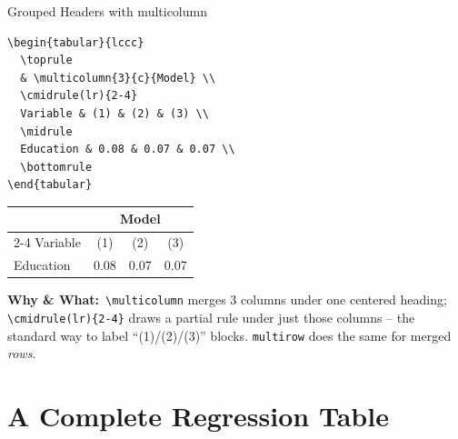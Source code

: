 \documentclass[11pt,aspectratio=169]{beamer}
\newcommand{\whybox}[1]{%
  \vspace{2pt}
  {\scriptsize\raggedright\textcolor{red!55!black}{\textbf{Why \& What:}}~#1\par}
}
\begin{document}
\begin{frame}[fragile]{Grouped Headers with multicolumn}
  \vspace{-4pt}
  \begin{lstlisting}[basicstyle=\ttfamily\tiny,aboveskip=1pt,belowskip=1pt]
\begin{tabular}{lccc}
  \toprule
  & \multicolumn{3}{c}{Model} \\
  \cmidrule(lr){2-4}
  Variable & (1) & (2) & (3) \\
  \midrule
  Education & 0.08 & 0.07 & 0.07 \\
  \bottomrule
\end{tabular}
  \end{lstlisting}
  \begin{outputbox}
    \footnotesize
    \begin{tabular}{lccc}
      \toprule
      & \multicolumn{3}{c}{Model} \\
      \cmidrule(lr){2-4}
      Variable & (1) & (2) & (3) \\
      \midrule
      Education & 0.08 & 0.07 & 0.07 \\
      \bottomrule
    \end{tabular}
  \end{outputbox}
  \whybox{\texttt{\textbackslash multicolumn} merges 3 columns under
  one centered heading; \texttt{\textbackslash cmidrule(lr)\{2-4\}}
  draws a partial rule under just those columns -- the standard way to
  label ``(1)/(2)/(3)'' blocks. \texttt{multirow} does the same for
  merged \emph{rows}.}
\end{frame}

\section{A Complete Regression Table}
\end{document}
